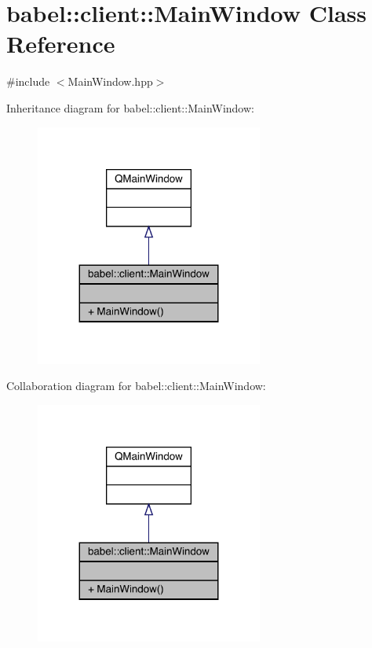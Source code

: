 \hypertarget{classbabel_1_1client_1_1_main_window}{}\section{babel\+:\+:client\+:\+:Main\+Window Class Reference}
\label{classbabel_1_1client_1_1_main_window}


{\ttfamily \#include $<$Main\+Window.\+hpp$>$}



Inheritance diagram for babel\+:\+:client\+:\+:Main\+Window\+:\nopagebreak
\begin{figure}[H]
\begin{center}
\leavevmode
\includegraphics[width=212pt]{classbabel_1_1client_1_1_main_window__inherit__graph}
\end{center}
\end{figure}


Collaboration diagram for babel\+:\+:client\+:\+:Main\+Window\+:\nopagebreak
\begin{figure}[H]
\begin{center}
\leavevmode
\includegraphics[width=212pt]{classbabel_1_1client_1_1_main_window__coll__graph}
\end{center}
\end{figure}
